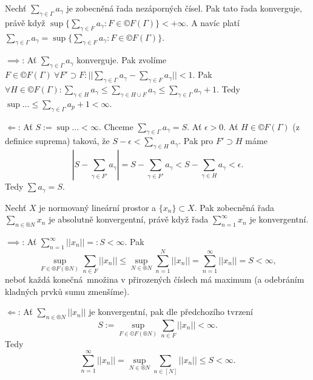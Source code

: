 \documentclass[12pt]{article}					%
\begin{document}
\begin{tvrzeni}
	Nechť $\sum_{\gamma \in \Gamma} a_\gamma$ je zobecněná řada nezáporných čísel. Pak tato řada konverguje, právě když $\sup\{\sum_{\gamma \in F} a_\gamma: F \in ©F(\Gamma)\} < +∞$. A navíc platí $\sum_{\gamma \in \Gamma} a_\gamma = \sup\{\sum_{\gamma \in F} a_\gamma: F \in ©F(\Gamma)\}$.

	\begin{dukazin}
		$\implies$: Ať $\sum_{\gamma \in \Gamma} a_\gamma$ konverguje. Pak zvolíme $F \in ©F(\Gamma)\ \forall F' \supset F: ||\sum_{\gamma \in \Gamma} a_\gamma - \sum_{\gamma \in F} a_\gamma|| < 1$.
		Pak $\forall H \in ©F(\Gamma): \sum_{\gamma \in H} a_\gamma ≤ \sum_{\gamma \in H \cup F} a_\gamma ≤ \sum_{\gamma \in \Gamma}a_\gamma + 1.$ Tedy $\sup… ≤ \sum_{\gamma \in \Gamma} a_p + 1 < ∞$.

		$\Leftarrow$: Ať $S:= \sup… < ∞$. Chceme $\sum_{\gamma \in \Gamma} a_\gamma = S$. Ať $\epsilon > 0$. Ať $H \in ©F(\Gamma)$ (z definice suprema) taková, že $S - \epsilon < \sum_{\gamma \in H} a_\gamma$. Pak pro $F' \supset H$ máme
		$$ |S - \sum_{\gamma \in F'} a_\gamma| = S - \sum_{\gamma \in F'} a_\gamma < S - \sum_{\gamma \in H}a_\gamma < \epsilon. $$
		Tedy $\sum a_\gamma = S$.
	\end{dukazin}
\end{tvrzeni}


\begin{tvrzeni}
	Nechť $X$ je normovaný lineární prostor a $\{x_n\} \subset X$. Pak zobecněná řada $\sum_{n \in ®N}x_n$ je absolutně konvergentní, právě když řada $\sum_{n=1}^∞ x_n$ je konvergentní.

	\begin{dukazin}
		$\implies$: Ať $\sum_{n=1}^∞ ||x_n|| =: S < ∞$. Pak
		$$ \sup_{F \in ®F(®N)} \sum_{n \in F} ||x_n|| ≤ \sup_{N \in ®N} \sum_{n=1}^N ||x_n|| = \sum_{n=1}^∞ ||x_n|| = S < ∞, $$
		neboť každá konečná množina v přirozených číslech má maximum (a odebráním kladných prvků sumu zmenšíme).

		$\Leftarrow$: Ať $\sum_{n \in ®N} ||x_n||$ je konvergentní, pak dle předchozího tvrzení
		$$ S:=\sup_{F \in ©F(®N)} \sum_{n \in F} ||x_n|| < ∞. $$
		Tedy
		$$ \sum_{n=1}^∞||x_n|| = \sup_{N \in ®N} \sum_{n \in [N]} ||x_n|| ≤ S < ∞. $$
	\end{dukazin}
\end{tvrzeni}
\end{document}

